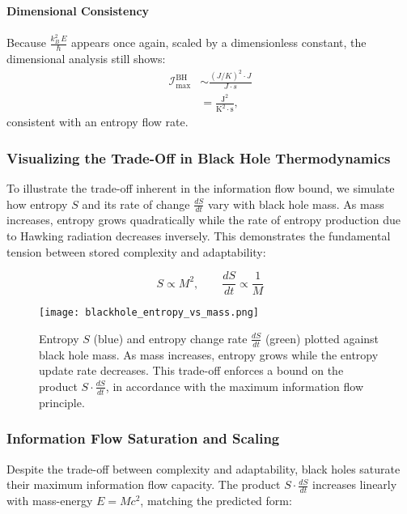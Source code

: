 \documentclass[12pt]{article}
\begin{document}
\paragraph{Dimensional Consistency}
Because \(\frac{k_B^2\,E}{\hbar}\) appears once again, scaled by a dimensionless constant, the dimensional analysis still shows:
\begin{align}
    \mathcal{I}_{\text{max}}^{\text{BH}} &\sim \frac{(J / K)^2 \cdot J}{J \cdot s} \nonumber \\
    &= \frac{\text{J}^2}{\text{K}^2 \cdot \text{s}},
\end{align}
consistent with an entropy flow rate.


\subsubsection{Visualizing the Trade-Off in Black Hole Thermodynamics}

To illustrate the trade-off inherent in the information flow bound, we simulate how entropy \( S \) and its rate of change \( \frac{dS}{dt} \) vary with black hole mass. As mass increases, entropy grows quadratically while the rate of entropy production due to Hawking radiation decreases inversely. This demonstrates the fundamental tension between stored complexity and adaptability:

\[
S \propto M^2,
\qquad
\frac{dS}{dt} \propto \frac{1}{M}
\]

\begin{figure}[H]
\centering
\texttt{[image: blackhole\_entropy\_vs\_mass.png]}
\caption{
Entropy \( S \) (blue) and entropy change rate \( \frac{dS}{dt} \) (green) plotted against black hole mass. As mass increases, entropy grows while the entropy update rate decreases. This trade-off enforces a bound on the product \( S \cdot \frac{dS}{dt} \), in accordance with the maximum information flow principle.
}
\end{figure}


\subsubsection{Information Flow Saturation and Scaling}

Despite the trade-off between complexity and adaptability, black holes saturate their maximum information flow capacity. The product \( S \cdot \frac{dS}{dt} \) increases linearly with mass-energy \( E = M c^2 \), matching the predicted form:
\end{document}
